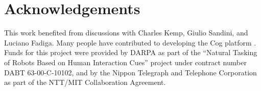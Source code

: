 
\iflong
\section*{Acknowledgements}
\else
\begin{Acknowledgment}
\fi

This work benefited from discussions with Charles Kemp, Giulio
Sandini, and Luciano Fadiga.  
Many people have contributed to developing the Cog platform
\cite{brooks99cog}.  Funds for this project were provided by DARPA as
part of the ``Natural Tasking of Robots Based on Human Interaction
Cues'' project under contract number DABT 63-00-C-10102, and by the
Nippon Telegraph and Telephone Corporation as part of the NTT/MIT
Collaboration Agreement.

\iflong
\else
\end{Acknowledgment}
\fi
